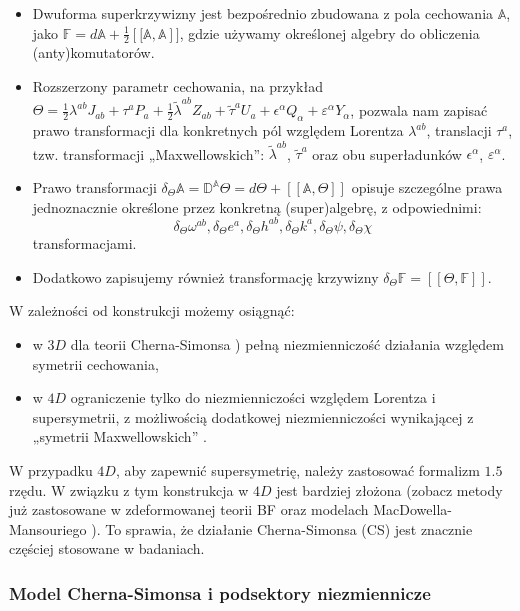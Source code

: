 \documentclass[12pt,a4paper]{article}
\begin{document}
\begin{itemize}
	\item Dwuforma superkrzywizny jest bezpośrednio zbudowana z pola cechowania $\mathbb{A}$, jako $\mathbb{F}=d\mathbb{A}+\frac{1}{2}\left[[\mathbb{A},\mathbb{A}\right]]$, gdzie
	używamy określonej algebry do obliczenia (anty)komutatorów.
	\item Rozszerzony parametr cechowania, na przykład $\Theta=\frac{1}{2} \lambda^{ab}J_{ab}+ \tau^{a}P_{a}+\frac{1}{2} \tilde{\lambda}^{ab}Z_{ab}+\tilde{\tau}^{a} U_{a}+\epsilon^{\alpha}Q_{\alpha}+\varepsilon^{\alpha}Y_{\alpha}$,
	pozwala nam zapisać prawo transformacji dla konkretnych pól względem Lorentza $\lambda^{ab}$, translacji $\tau^a$, tzw. transformacji „Maxwellowskich”: $\tilde{\lambda}^{ab}$, $\tilde{\tau}^a$ oraz obu superładunków $\epsilon^\alpha$, $\varepsilon^\alpha$.
	\item Prawo transformacji $\delta_\Theta \mathbb{A}= \mathbb{D}^\mathbb{A}\Theta= d\Theta+[[\mathbb{A},\Theta]]$ opisuje szczególne prawa jednoznacznie określone przez konkretną (super)algebrę, z odpowiednimi:
	$$\delta_\Theta\omega^{ab},\delta_\Theta e^{a},\delta_\Theta h^{ab},\delta_\Theta k^{a},\delta_\Theta\psi,\delta_\Theta\chi$$
	transformacjami. 
	\item Dodatkowo zapisujemy również transformację krzywizny $\delta_\Theta \mathbb{F}= [[\Theta,\mathbb{F}]]$.
\end{itemize}
W zależności od konstrukcji możemy osiągnąć:
\begin{itemize}
	\item w $3D$ dla teorii Cherna-Simonsa \cite{Concha:2014tca, Hassaine:2016amq}) pełną niezmienniczość działania względem symetrii cechowania,
	\item w $4D$ ograniczenie tylko do niezmienniczości względem Lorentza i supersymetrii, z możliwością dodatkowej niezmienniczości wynikającej z „symetrii Maxwellowskich” \cite{Durka:2011gm, Durka:2011va, Kamimura:2011mq}.
\end{itemize}
W przypadku $4D$, aby zapewnić supersymetrię, należy zastosować formalizm $1.5$ rzędu. W związku z tym konstrukcja w $4D$ jest bardziej złożona (zobacz metody już zastosowane w zdeformowanej teorii BF \cite{Durka:2011gm, Durka:2012wd} oraz modelach MacDowella-Mansouriego \cite{Gocanin:2019ota, MacDowell:1977jt}). To sprawia, że działanie Cherna-Simonsa (CS) jest znacznie częściej stosowane w badaniach.

\subsubsection{Model Cherna-Simonsa i podsektory niezmiennicze}
\end{document}
